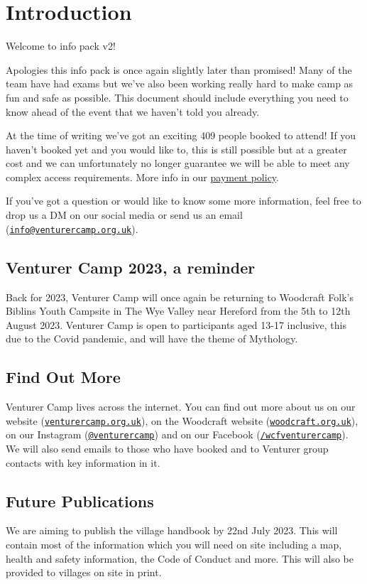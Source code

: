 \documentclass[a4paper, 11pt]{report}
\makeatletter
\newcommand{\nl}{\newline}
\newcommand{\infoemail}{\href{mailto:info@venturercamp.org.uk}{\texttt{info@venturercamp.org.uk}}}
\makeatother
\begin{document}
\tableofcontents
\chapter{Introduction}
Welcome to info pack v2!\nl

Apologies this info pack is once again slightly later than promised! Many of the team have had exams but we've also been working really hard to make camp as fun and safe as possible. This document should include everything you need to know ahead of the event that we haven't told you already.\nl 

At the time of writing we've got an exciting 409 people booked to attend! If you haven't booked yet and you would like to, this is still possible but at a greater cost and we can unfortunately no longer guarantee we will be able to meet any complex access requirements. More info in our \href{https://venturercamp.org.uk/wp-content/uploads/2023/05/payment-policy-v2.pdf}{payment policy}.\nl

If you've got a question or would like to know some more information, feel free to drop us a DM on our social media or send us an email (\infoemail).

\section{Venturer Camp 2023, a reminder}
Back for 2023, Venturer Camp will once again be returning to Woodcraft Folk's Biblins Youth Campsite in The Wye Valley near Hereford from the 5th to 12th August 2023. Venturer Camp is open to participants aged 13-17 inclusive, this due to the Covid pandemic, and will have the theme of Mythology.

\section{Find Out More}
Venturer Camp lives across the internet. You can find out more about us on our website (\href{https://venturercamp.org.uk}{\texttt{venturercamp.org.uk}}), on the Woodcraft website (\href{https://woodcraft.org.uk}{\texttt{woodcraft.org.uk}}), on our Instagram (\href{https://www.instagram.com/venturercamp/}{\texttt{@venturercamp}}) and on our Facebook (\href{https://www.facebook.com/wcfventurercamp}{\texttt{/wcfventurercamp}}).
We will also send emails to those who have booked and to Venturer group contacts with key information in it.

\section{Future Publications}
We are aiming to publish the village handbook by 22nd July 2023. This will contain most of the information which you will need on site including a map, health and safety information, the Code of Conduct and more. This will also be provided to villages on site in print.
\end{document}
